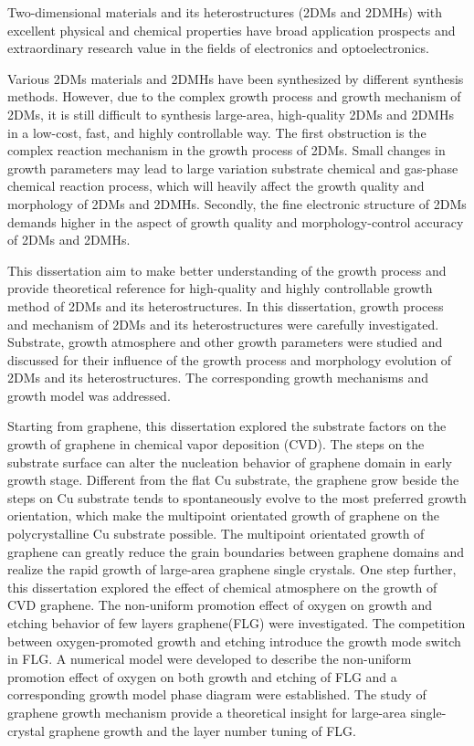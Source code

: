 \begin{englishabstract}
    Two-dimensional materials and its heterostructures (2DMs and 2DMHs) with excellent physical and chemical properties have broad application prospects and extraordinary research value in the fields of electronics and optoelectronics.

    Various 2DMs materials and 2DMHs have been synthesized by different synthesis methods. However, due to the complex growth process and growth  mechanism of 2DMs, it is still difficult to synthesis large-area, high-quality 2DMs and 2DMHs in a low-cost, fast, and highly controllable way. The first obstruction is the complex reaction mechanism in the growth process of 2DMs. Small changes in growth parameters may lead to large variation substrate chemical and gas-phase chemical reaction process, which will heavily affect the growth quality and morphology of 2DMs and 2DMHs. Secondly, the fine electronic structure of 2DMs demands higher in the aspect of growth quality and morphology-control accuracy of 2DMs and 2DMHs.

    This dissertation aim to make better understanding of the growth process and provide theoretical reference for high-quality and highly controllable growth method of 2DMs and its heterostructures. In this dissertation, growth process and mechanism of 2DMs and its heterostructures were carefully investigated. Substrate, growth atmosphere and other growth parameters were studied and discussed for their influence of the growth process and morphology evolution of 2DMs and its heterostructures. The corresponding growth mechanisms and growth model was addressed.

    Starting from graphene, this dissertation explored the substrate factors on the growth of graphene in chemical vapor deposition (CVD). The steps on the substrate surface can alter the nucleation behavior of graphene domain in early growth stage. Different from the flat Cu substrate, the graphene grow beside the steps on Cu substrate tends to spontaneously evolve to the most preferred growth orientation, which make the multipoint orientated growth of graphene on the polycrystalline Cu substrate possible. The multipoint orientated growth of graphene can greatly reduce the grain boundaries between graphene domains and realize the rapid growth of large-area graphene single crystals. One step further, this dissertation explored the effect of chemical atmosphere on the growth of CVD graphene. The non-uniform promotion effect of oxygen on growth and etching behavior of few layers graphene(FLG) were investigated. The competition between oxygen-promoted growth and etching introduce the growth mode switch in FLG. A numerical model were developed to describe the non-uniform promotion effect of oxygen on both growth and etching of FLG and a corresponding growth model phase diagram were established. The study of graphene growth mechanism provide a theoretical insight for large-area single-crystal graphene growth and the layer number tuning of FLG.
    

\end{englishabstract}
